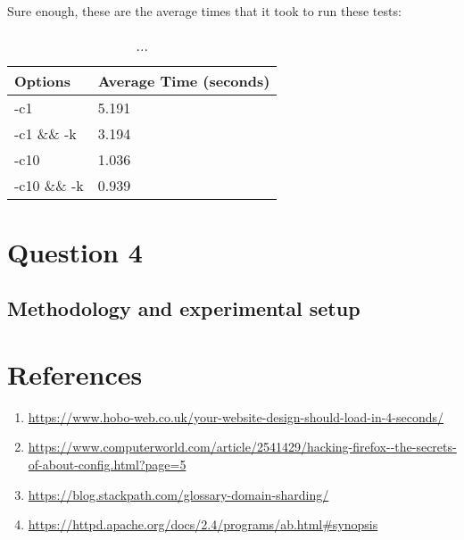 \documentclass[a4paper,10pt]{article}
\begin{document}
Sure enough, these are the average times that it took to run these tests:




\begin{table}[h!]
\centering
\begin{tabular}{|l|l|}
\hline
Options      & Average Time (seconds) \\ \hline
-c1          & 5.191        \\ \hline
-c1 \&\& -k  & 3.194        \\ \hline
-c10         & 1.036        \\ \hline
-c10 \&\& -k & 0.939        \\ \hline



\end{tabular}

\caption{...}
\label{fig:table2}

\end{table}



\section{Question 4}
\subsection{Methodology and experimental setup}

\clearpage


\section{References}

\begin{enumerate}

\item \label{article1} \url{https://www.hobo-web.co.uk/your-website-design-should-load-in-4-seconds/} 

\item \label{article2} \url{https://www.computerworld.com/article/2541429/hacking-firefox--the-secrets-of-about-config.html?page=5} 

\item \label{article3} \url{https://blog.stackpath.com/glossary-domain-sharding/} 


\item \label{article4} \url{https://httpd.apache.org/docs/2.4/programs/ab.html#synopsis} 



\end{enumerate}
\end{document}
